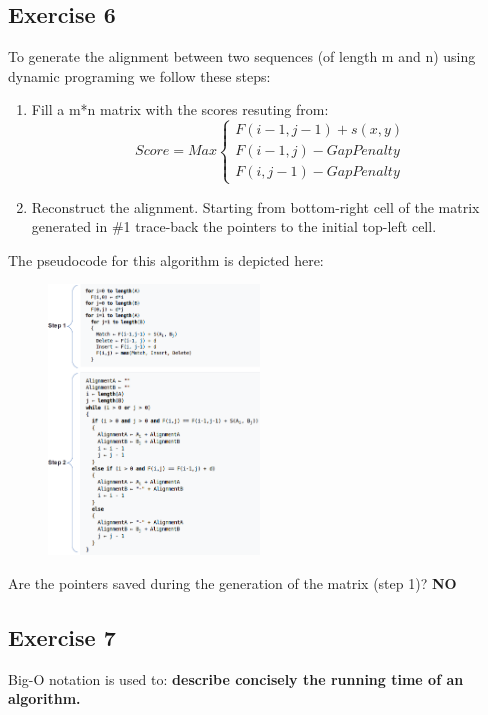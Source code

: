 \subsection{Exercise 6}
To generate the alignment between two sequences (of length m and n) using dynamic programing we follow these steps:
\begin{enumerate}
\item  Fill a m*n matrix with the scores resuting from: 
$$ Score = Max 
  \begin{cases}
    F(i-1, j-1) + s(x,y)\\ 
    F(i-1, j) - GapPenalty \\
    F(i, j-1) - GapPenalty
  \end{cases}
$$
  
\item  Reconstruct the alignment. Starting from bottom-right cell of the matrix generated in \#1 trace-back the pointers to the initial top-left cell.
\end{enumerate}

The pseudocode for this algorithm is depicted here:
\begin{figure}[htbp]
\centering
\includegraphics[width = 0.5\textwidth]{figs/exam-ex6.png}
\end{figure}

Are the pointers saved during the generation of the matrix (step 1)? \textbf{NO}

\subsection{Exercise 7}
Big-O notation is used to: \textbf{describe concisely the running time of an algorithm.}

